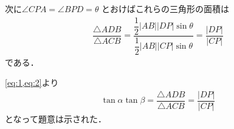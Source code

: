 \documentclass[../../main.tex]{subfiles}
\begin{document}
次に$\angle CPA = \angle BPD = \theta$ とおけばこれらの三角形の面積は
\begin{align}
  \dfrac{\triangle ADB}{\triangle ACB}
  = \dfrac{\dfrac{1}{2} |AB||DP| \sin\theta}{\dfrac{1}{2} |AB||CP| \sin\theta}
  = \dfrac{|DP|}{|CP|} \label{eq:2}
\end{align}
である．

\cref{eq:1,eq:2}より
\begin{align}
  \tan\alpha \tan\beta = \dfrac{\triangle ADB}{\triangle ACB} = \dfrac{|DP|}{|CP|}
\end{align}
となって題意は示された．

\newpage
\end{document}
